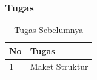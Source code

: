 \documentclass[../main.tex]{subfiles}
\begin{document}
\begin{frame}[mytitle=standard,t,mycolor=digiPH_creamy,dark]
	\frametitle{Tugas}
	\begin{table}[htb]
		\caption{Tugas Sebelumnya}
		\begin{tabularx}{\textwidth}{|p{1cm}|X|}
			\hline
			\textbf{No} & \textbf{Tugas} \\ \hline
			1           & Maket Struktur \\ \hline
		\end{tabularx}
	\end{table}
\end{frame}



\end{document}
